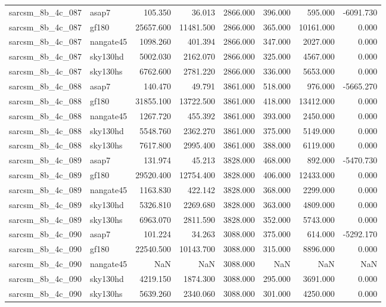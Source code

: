 \begin{tabular}{llrrrrrr}
sarcsm\_8b\_4c\_087 & asap7 & 105.350 & 36.013 & 2866.000 & 396.000 & 595.000 & -6091.730 \\
sarcsm\_8b\_4c\_087 & gf180 & 25657.600 & 11481.500 & 2866.000 & 365.000 & 10161.000 & 0.000 \\
sarcsm\_8b\_4c\_087 & nangate45 & 1098.260 & 401.394 & 2866.000 & 347.000 & 2027.000 & 0.000 \\
sarcsm\_8b\_4c\_087 & sky130hd & 5002.030 & 2162.070 & 2866.000 & 325.000 & 4567.000 & 0.000 \\
sarcsm\_8b\_4c\_087 & sky130hs & 6762.600 & 2781.220 & 2866.000 & 336.000 & 5653.000 & 0.000 \\
sarcsm\_8b\_4c\_088 & asap7 & 140.470 & 49.791 & 3861.000 & 518.000 & 976.000 & -5665.270 \\
sarcsm\_8b\_4c\_088 & gf180 & 31855.100 & 13722.500 & 3861.000 & 418.000 & 13412.000 & 0.000 \\
sarcsm\_8b\_4c\_088 & nangate45 & 1267.720 & 455.392 & 3861.000 & 393.000 & 2450.000 & 0.000 \\
sarcsm\_8b\_4c\_088 & sky130hd & 5548.760 & 2362.270 & 3861.000 & 375.000 & 5149.000 & 0.000 \\
sarcsm\_8b\_4c\_088 & sky130hs & 7617.800 & 2995.400 & 3861.000 & 388.000 & 6119.000 & 0.000 \\
sarcsm\_8b\_4c\_089 & asap7 & 131.974 & 45.213 & 3828.000 & 468.000 & 892.000 & -5470.730 \\
sarcsm\_8b\_4c\_089 & gf180 & 29520.400 & 12754.400 & 3828.000 & 406.000 & 12433.000 & 0.000 \\
sarcsm\_8b\_4c\_089 & nangate45 & 1163.830 & 422.142 & 3828.000 & 368.000 & 2299.000 & 0.000 \\
sarcsm\_8b\_4c\_089 & sky130hd & 5326.810 & 2269.680 & 3828.000 & 363.000 & 4809.000 & 0.000 \\
sarcsm\_8b\_4c\_089 & sky130hs & 6963.070 & 2811.590 & 3828.000 & 352.000 & 5743.000 & 0.000 \\
sarcsm\_8b\_4c\_090 & asap7 & 101.224 & 34.263 & 3088.000 & 375.000 & 614.000 & -5292.170 \\
sarcsm\_8b\_4c\_090 & gf180 & 22540.500 & 10143.700 & 3088.000 & 315.000 & 8896.000 & 0.000 \\
sarcsm\_8b\_4c\_090 & nangate45 & NaN & NaN & 3088.000 & NaN & NaN & NaN \\
sarcsm\_8b\_4c\_090 & sky130hd & 4219.150 & 1874.300 & 3088.000 & 295.000 & 3691.000 & 0.000 \\
sarcsm\_8b\_4c\_090 & sky130hs & 5639.260 & 2340.060 & 3088.000 & 301.000 & 4250.000 & 0.000 \\

\end{tabular}
